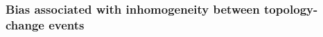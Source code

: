 \documentclass[11pt]{article}
\begin{document}


% 

% 
%
%
%

\subsubsection{Bias associated with inhomogeneity between topology-change events}
\end{document}
